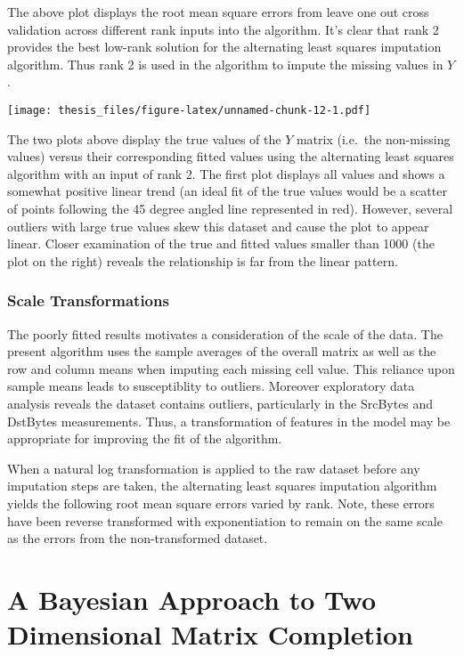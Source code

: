 \documentclass[12pt,twoside]{dukestatscithesis}
\theoremstyle{definition}
\theoremstyle{definition}
\theoremstyle{definition}
\theoremstyle{remark}
\begin{document}
The above plot displays the root mean square errors from leave one out
cross validation across different rank inputs into the algorithm. It's
clear that rank 2 provides the best low-rank solution for the
alternating least squares imputation algorithm. Thus rank 2 is used in
the algorithm to impute the missing values in \(Y\).

\texttt{[image: thesis\_files/figure-latex/unnamed-chunk-12-1.pdf]}

The two plots above display the true values of the \(Y\) matrix
(i.e.~the non-missing values) versus their corresponding fitted values
using the alternating least squares algorithm with an input of rank 2.
The first plot displays all values and shows a somewhat positive linear
trend (an ideal fit of the true values would be a scatter of points
following the 45 degree angled line represented in red). However,
several outliers with large true values skew this dataset and cause the
plot to appear linear. Closer examination of the true and fitted values
smaller than 1000 (the plot on the right) reveals the relationship is
far from the linear pattern.

\subsection{Scale Transformations}\label{scale-transformations}

The poorly fitted results motivates a consideration of the scale of the
data. The present algorithm uses the sample averages of the overall
matrix as well as the row and column means when imputing each missing
cell value. This reliance upon sample means leads to susceptiblity to
outliers. Moreover exploratory data analysis reveals the dataset
contains outliers, particularly in the SrcBytes and DstBytes
measurements. Thus, a transformation of features in the model may be
appropriate for improving the fit of the algorithm.

When a natural log transformation is applied to the raw dataset before
any imputation steps are taken, the alternating least squares imputation
algorithm yields the following root mean square errors varied by rank.
Note, these errors have been reverse transformed with exponentiation to
remain on the same scale as the errors from the non-transformed dataset.

\chapter{A Bayesian Approach to Two Dimensional Matrix
Completion}\label{a-bayesian-approach-to-two-dimensional-matrix-completion}
\end{document}
